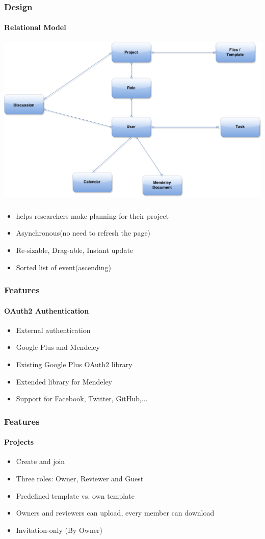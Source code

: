 \documentclass{beamer}
\begin{document}
\begin{frame}
\frametitle{Design}\framesubtitle{Relational Model}
\centering
\includegraphics[scale=0.2]{./images/RMA.png}
\end{frame}

\begin{frame}
\frametitle{}\framesubtitle{}
	\begin{itemize}
		\item helps researchers make planning for their project 
		\item Asynchronous(no need to refresh the page)
		\item Re-sizable, Drag-able, Instant update
		\item Sorted list of event(ascending) 
	\end{itemize}
\end{frame}


\begin{frame}
\frametitle{Features}
\framesubtitle{OAuth2 Authentication}
	\begin{itemize}
		\item External authentication
		\item Google Plus and Mendeley
		\item Existing Google Plus OAuth2 library
		\item Extended library for Mendeley
		\item Support for Facebook, Twitter, GitHub,...
	\end{itemize}
\end{frame}

\begin{frame}
\frametitle{Features}
\framesubtitle{Projects}
	\begin{itemize}
		\item Create and join
		\item Three roles: Owner, Reviewer and Guest
		\item Predefined template vs. own template
		\item Owners and reviewers can upload, every member can download
		\item Invitation-only (By Owner)
	\end{itemize}
\end{frame}
\end{document}
